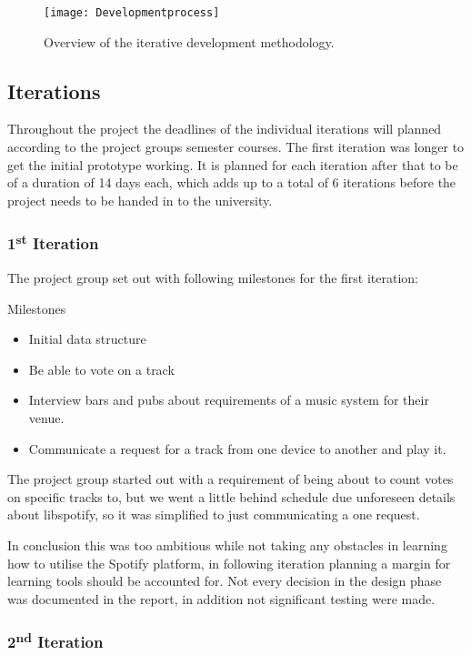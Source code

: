 \begin{figure}[hbtp]
  \centering
  \texttt{[image: Developmentprocess]}
  \caption{Overview of the iterative development methodology.}\label{fig:developmentprocess}
\end{figure}

\subsection{Iterations}

Throughout the project the deadlines of the individual iterations will planned according to the project groups semester courses. The first iteration was longer to get the initial prototype working. It is planned for each iteration after that to be of a duration of 14 days each, which adds up to a total of 6 iterations before the project needs to be handed in to the university.

\subsubsection{1\textsuperscript{st} Iteration}

	The project group set out with following milestones for the first iteration:

	Milestones
	\begin{itemize}
		\item Initial data structure
		\item Be able to vote on a track
		\item Interview bars and pubs about requirements of a music system for their venue.
		\item Communicate a request for a track from one device to another and play it.
	\end{itemize}

	The project group started out with a requirement of being about to count votes on specific tracks to, but we went a little behind schedule due unforeseen details about libspotify, so it was simplified to just communicating a one request.

	In conclusion this was too ambitious while not taking any obstacles in learning how to utilise the Spotify platform, in following iteration planning a margin for learning tools should be accounted for. Not every decision in the design phase was documented in the report, in addition not significant testing were made.

\subsubsection{2\textsuperscript{nd} Iteration}

